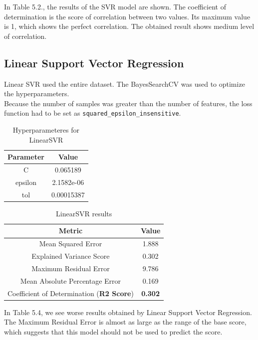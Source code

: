 \documentclass[times, utf8, zavrsni, english]{fer}
\begin{document}
In Table 5.2., the results of the SVR model are shown.
The coefficient of determination is the score of correlation between two values. Its maximum value is 1, which shows the perfect correlation.
The obtained result shows medium level of correlation.

\subsection{Linear Support Vector Regression}
Linear SVR used the entire dataset. The BayesSearchCV was used to optimize the hyperparameters.\\
Because the number of samples was greater than the number of features, the loss function had to be set as \texttt{squared\_epsilon\_insensitive}.
\begin{table}[h!]
	
		\centering
		\begin{tabular}{|| c | c ||} 
			\hline
			Parameter & Value \\ [0.5ex] 
			\hline\hline
			C & 0.065189  \\ \hline
			epsilon & 2.1582e-06 \\ \hline
			tol & 0.00015387  \\ 
			\hline
		\end{tabular}
		\caption{Hyperparameteres for LinearSVR}
		\label{table:6}
\end{table}
\begin{table}
		\centering
		\begin{tabular}{|| c | c ||} 
			\hline
			Metric & Value \\ [0.5ex] 
			\hline\hline
			Mean Squared Error & 1.888  \\ \hline
			Explained Variance Score & 0.302\\ \hline
			Maximum Residual Error & 9.786 \\ \hline
			Mean Absolute Percentage Error & 0.169 \\ \hline
			Coefficient of Determination (\textbf{R2 Score}) & \textbf{0.302} \\
			\hline
		\end{tabular}
		\caption{LinearSVR results}
		\label{table:7}
	
\end{table}

In Table 5.4, we see worse results obtained by Linear Support Vector Regression.
The Maximum Residual Error is almost as large as the range of the base score, which suggests that this model should not be used to predict the score.
\end{document}
